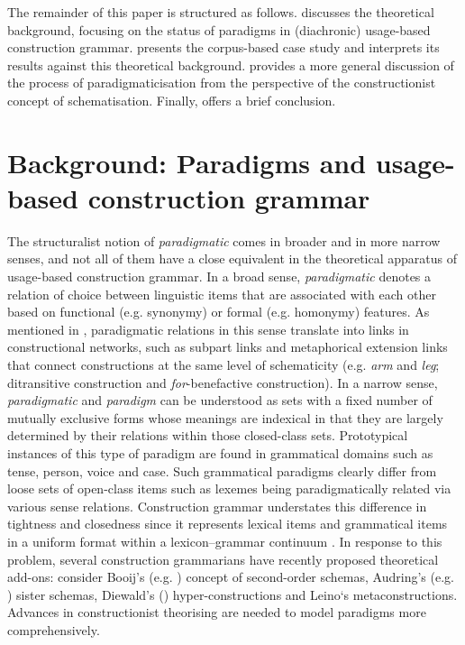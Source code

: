 \documentclass[output=paper]{langsci/langscibook}
\begin{document}
\begin{sloppypar}
The remainder of this paper is structured as follows.  discusses the theoretical background, focusing on the status of paradigms in (diachronic) usage-based construction grammar.  presents the corpus-based case study and interprets its results against this theoretical background.  provides a more general discussion of the process of paradigmaticisation from the perspective of the constructionist concept of schematisation. Finally,  offers a brief conclusion.
\end{sloppypar}

\section{Background: Paradigms and usage-based construction grammar} \label{paradigms}

The structuralist notion of \textit{paradigmatic} comes in broader and in more narrow senses, and not all of them have a close equivalent in the theoretical apparatus of usage-based construction grammar. In a broad sense, \textit{paradigmatic} denotes a relation of choice between linguistic items that are associated with each other based on functional (e.g. synonymy) or formal (e.g. homonymy) features. As mentioned in , paradigmatic relations in this sense translate into links in constructional networks, such as subpart links and metaphorical extension links \citep[e.g.][]{GoldbergConstructionsConstructionGrammar1995} that connect constructions at the same level of schematicity (e.g. \textit{arm} and \textit{leg}; ditransitive construction and \textit{for}-benefactive construction). In a narrow sense, \emph{paradigmatic} and \emph{paradigm} can be understood as sets with a fixed number of mutually exclusive forms whose meanings are indexical in that they are largely determined by their relations within those closed-class sets. Prototypical instances of this type of paradigm are found in grammatical domains such as tense, person, voice and case. Such grammatical paradigms clearly differ from loose sets of open-class items such as lexemes being paradigmatically related via various sense relations. Construction grammar understates this difference in tightness and closedness since it represents lexical items and grammatical items in a uniform format within a lexicon–grammar continuum \citep[cf.][]{Diewald2020b}. In response to this problem, several construction grammarians have recently proposed theoretical add-ons: consider Booij's (e.g. \citealt{Booijrolesecondorderschemas2015}) concept of second-order schemas, Audring’s (e.g. \citeyear{AudringMotherssistersencoding2019}) sister schemas, Diewald’s (\citeyear{Diewald2020b}) hyper-constructions and Leino`s  metaconstructions. Advances in constructionist theorising are needed to model paradigms more comprehensively. 
\end{document}
